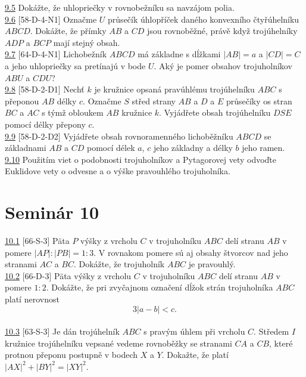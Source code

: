 \noindent \ul{9.5} Dokážte, že uhlopriečky v rovnobežníku sa navzájom polia.\\

\noindent \ul{9.6} [58-D-4-N1]  Označme $U$ průsečík úhlopříček daného konvexního čtyřúhelníku
$ABCD$. Dokážte, že přímky $AB$ a $CD$ jsou rovnoběžné, právě když trojúhelníky $ADP$ a $BCP$
mají stejný obsah.\\

\noindent \ul{9.7} [64-D-4-N1] Lichobežník $ABCD$ má základne s dĺžkami $|AB|=a$ a $|CD|=C$ a jeho uhlopriečky sa pretínajú v bode $U$. Aký je pomer obsahov trojuholníkov $ABU$ a $CDU$?\\

\noindent \ul{9.8} [58-D-2-D1] Nechť $k$ je kružnice opsaná pravúhlému trojúhelníku $ABC$ s
přeponou $AB$ délky $c$. Označme $S$ střed strany $AB$ a $D$ a $E$ průsečíky os stran $BC$ a $AC$
s týmž obloukem $AB$ kružnice $k$. Vyjádřete obsah trojúhelníku $DSE$ pomocí délky přepony $c$.\\

\noindent \ul{9.9} [58-D-2-D2] Vyjádřete obsah rovnoramenného lichoběžníku $ABCD$ se základnami $AB$
a $CD$ pomocí délek $a$, $c$ jeho základny a délky $b$ jeho ramen.\\

\noindent \ul{9.10} Použitím viet o podobnosti trojuholníkov a Pytagorovej vety odvoďte Euklidove vety o odvesne a o výške pravouhlého trojuholníka.\\

\section*{Seminár 10}
\noindent \ul{10.1} [66-S-3] Päta $P$ výšky z vrcholu $C$ v trojuholníku $ABC$ delí stranu $AB$ v pomere $|AP| : |PB|= 1 : 3$. V rovnakom pomere sú aj obsahy štvorcov nad jeho stranami $AC$ a $BC$.
Dokážte, že trojuholník $ABC$ je pravouhlý.\\

\noindent \ul{10.2} [66-D-3]
Päta výšky z vrcholu $C$ v trojuholníku $ABC$ delí stranu $AB$ v pomere $1 : 2$. Dokážte, že pri zvyčajnom označení dĺžok strán trojuholníka $ABC$ platí nerovnost $$3|a - b| < c.$$\\

\noindent \ul{10.3} [63-S-3] Je dán trojúhelník $ABC$ s pravým úhlem při vrcholu
$C$. Středem $I$ kružnice trojúhelníku vepsané vedeme rovnoběžky se stranami
$CA$ a $CB$, které protnou přeponu postupně v bodech $X$ a $Y$. Dokažte, že
platí $|AX|^2 + |BY |^2 = |XY |^2$.\\

